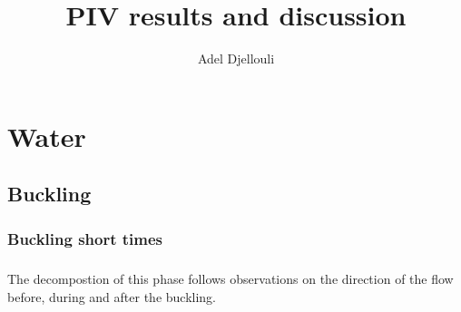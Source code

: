 \documentclass[a4paper,10pt]{report}
\begin{document}
\pagestyle{empty} %



\title{PIV results and discussion}
\author{Adel Djellouli}
\maketitle



\tableofcontents %
\cleardoublepage %

\pagestyle{plain} %
\chapter{Water}
\section{Buckling}
\subsection{Buckling short times}
\paragraph{}
The decompostion of this phase follows observations on the direction of the flow before, during and after the buckling.
\end{document}
